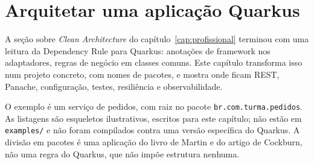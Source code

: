 \chapter{Arquitetar uma aplicação Quarkus}
\label{cap:arquitetura-quarkus}

\proximasaulas

A seção sobre \emph{Clean Architecture} do capítulo~\ref{cap:profissional}
terminou com uma leitura da Dependency Rule para Quarkus: anotações de
framework nos adaptadores, regras de negócio em classes comuns. Este
capítulo transforma isso num projeto concreto, com nomes de pacotes,
e mostra onde ficam REST, Panache, configuração, testes, resiliência e
observabilidade.

O exemplo é um serviço de pedidos, com raiz no pacote
\texttt{br.com.turma.pedidos}. As listagens são esqueletos ilustrativos,
escritos para este capítulo; não estão em \texttt{examples/} e não
foram compilados contra uma versão específica do Quarkus. A divisão em
pacotes é uma aplicação do livro de Martin e do artigo de Cockburn, não
uma regra do Quarkus, que não impõe estrutura nenhuma.









